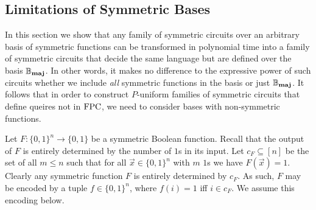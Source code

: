 \documentclass[../paper.tex]{subfiles}
\begin{document}




\subsection{Limitations of Symmetric Bases}
In this section we show that any family of symmetric circuits over an arbitrary
basis of symmetric functions can be transformed in polynomial time into a family
of symmetric circuits that decide the same language but are defined over the
basis $\mathbb{B}_{\text{\textbf{maj}}}$. In other words, it makes no difference to the
expressive power of such circuits whether we include \emph{all} symmetric
functions in the basis or just $\mathbb{B}_{\text{\textbf{maj}}}$. It follows that in order to
construct $P$-uniform families of symmetric circuits that define queires not in
$\text{\upshape FPC}$, we need to consider bases with non-symmetric functions.


Let $F : \{0,1\}^n\rightarrow \{0,1\}$ be a symmetric Boolean function. Recall
that the output of $F$ is entirely determined by the number of $1$s in its
input. Let $c_{F} \subseteq [n]$ be the set of all $m \leq n$ such that for all
$\vec{x} \in \{ 0,1 \}^n$ with $m$ $1$s we have $F (\vec{x}) = 1$. Clearly any
symmetric function $F$ is entirely determined by $c_{F}$. As such, $F$ may be
encoded by a tuple $f \in \{0,1\}^{n}$, where $f (i) = 1 $ iff $i \in c_{F}$. We
assume this encoding below.
 
\end{document}
